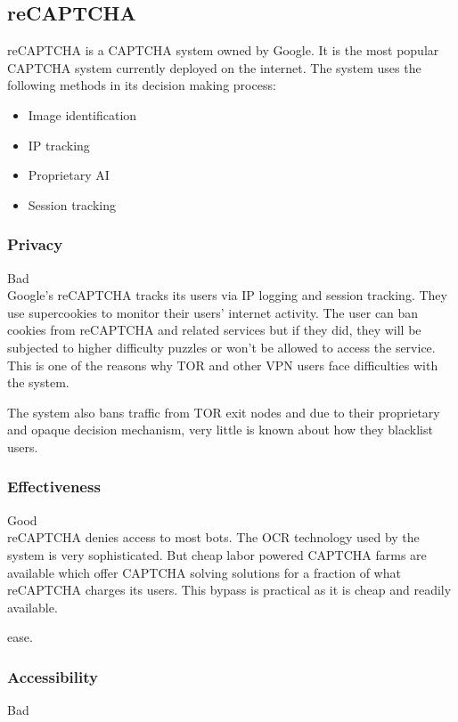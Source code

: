 \subsection{reCAPTCHA}

reCAPTCHA is a CAPTCHA system owned by Google. It is the most popular CAPTCHA
system currently deployed on the internet. The system uses the following methods
in its decision making process:

\begin{itemize}
	\item Image identification
	\item IP tracking
	\item Proprietary AI
	\item Session tracking
\end{itemize}

\subsubsection{Privacy}
Bad\\
Google's reCAPTCHA tracks its users via IP logging and session tracking. They
use supercookies to monitor their users' internet activity. The user can ban
cookies from reCAPTCHA and related services but if they did, they will be
subjected to higher difficulty puzzles or won't be allowed to access the
service. This is one of the reasons why TOR and other VPN users face
difficulties with the system.

The system also bans traffic from TOR exit nodes and due to their proprietary
and opaque decision mechanism, very little is known about how they blacklist
users.
\subsubsection{Effectiveness}
Good\\

reCAPTCHA denies access to most bots. The OCR technology used by the system is
very sophisticated. But cheap labor powered CAPTCHA farms are available which
offer CAPTCHA solving solutions for a fraction of what reCAPTCHA charges its
users. This bypass is practical as it is cheap and readily available. 

ease.
\subsubsection{Accessibility}
Bad\\


